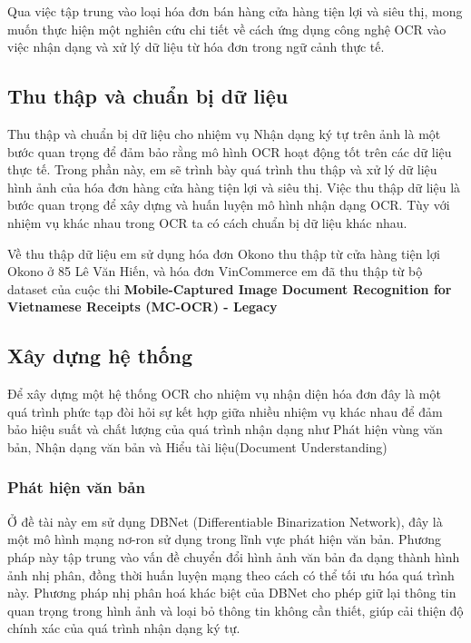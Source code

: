 Qua việc tập trung vào loại hóa đơn bán hàng cửa hàng tiện lợi và siêu thị, mong muốn thực hiện một nghiên cứu chi tiết về cách ứng dụng công nghệ OCR vào việc nhận dạng và xử lý dữ liệu từ hóa đơn trong ngữ cảnh thực tế.

\subsection{Thu thập và chuẩn bị dữ liệu}
Thu thập và chuẩn bị dữ liệu cho nhiệm vụ Nhận dạng ký tự trên ảnh là một bước quan trọng để đảm bảo rằng mô hình OCR hoạt động tốt trên các dữ liệu thực tế. Trong phần này, em sẽ trình bày quá trình thu thập và xử lý dữ liệu hình ảnh của hóa đơn hàng cửa hàng tiện lợi và siêu thị. Việc thu thập dữ liệu là bước quan trọng để xây dựng và huấn luyện mô hình nhận dạng OCR. Tùy với nhiệm vụ khác nhau trong OCR ta có cách chuẩn bị dữ liệu khác nhau.

Về thu thập dữ liệu em sử dụng hóa đơn Okono thu thập từ cửa hàng tiện lợi Okono ở 85 Lê Văn Hiến, và hóa đơn VinCommerce em đã thu thập từ bộ dataset của cuộc thi \textbf{Mobile-Captured Image Document Recognition for Vietnamese Receipts (MC-OCR) - Legacy}




\subsection{Xây dựng hệ thống}
Để xây dựng một hệ thống OCR cho nhiệm vụ nhận diện hóa đơn đây là một quá trình phức tạp đòi hỏi sự kết hợp giữa nhiều nhiệm vụ khác nhau để đảm bảo hiệu suất và chất lượng của quá trình nhận dạng như Phát hiện vùng văn bản, Nhận dạng văn bản và Hiểu tài liệu(Document Understanding)

\subsubsection{Phát hiện văn bản}
Ở đề tài này em sử dụng DBNet \cite{liao2019realtime} (Differentiable Binarization Network), đây là một mô hình mạng nơ-ron sử dụng trong lĩnh vực phát hiện văn bản. Phương pháp này tập trung vào vấn đề chuyển đổi hình ảnh văn bản đa dạng thành hình ảnh nhị phân, đồng thời huấn luyện mạng theo cách có thể tối ưu hóa quá trình này. Phương pháp nhị phân hoá khác biệt của DBNet cho phép giữ lại thông tin quan trọng trong hình ảnh và loại bỏ thông tin không cần thiết, giúp cải thiện độ chính xác của quá trình nhận dạng ký tự.

